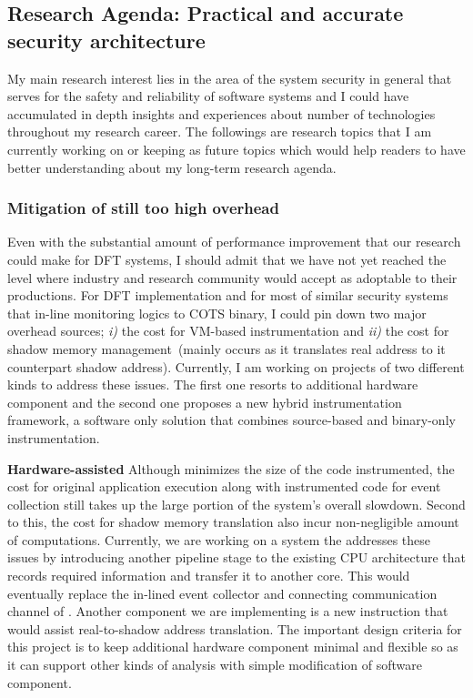 \documentclass[letterpaper, 10pt]{article}
\begin{document}
\begin{small}
\subsection*{Research Agenda: Practical and accurate security architecture}
%
My main research interest lies in the area of the system security in general
that serves for the safety and reliability of software systems  and I could
have accumulated in depth insights and experiences about number of technologies
throughout my research career.
%
The followings are research topics that I am currently working on or keeping as
future topics which would help readers to have better understanding about my
long-term research agenda.
%

\subsubsection*{Mitigation of still too high overhead}
%
Even with the substantial amount of performance improvement that our research
could make for DFT systems, I should admit that we have not yet reached the
level where industry and research community would accept as adoptable to their
productions.
%
For DFT implementation and for most of similar security systems that in-line
monitoring logics to COTS binary, I could pin down two major overhead sources;
{\it i)} the cost for VM-based instrumentation and {\it ii)} the cost for
shadow memory management~(mainly occurs as it translates real address to it
counterpart shadow address).
%
Currently, I am working on projects of two different kinds to address these
issues. The first one resorts to additional hardware component and the second
one proposes a new hybrid instrumentation framework, a software only
solution that combines source-based and binary-only instrumentation.

{\bf Hardware-assisted \SR} Although \SR minimizes the size of the code
instrumented, the cost for original application execution along with
instrumented code for event collection still takes up the large portion of the
system's overall slowdown. Second to this, the cost for shadow memory
translation also incur non-negligible amount of computations.
%
Currently, we are working on a system the addresses these issues by introducing
another pipeline stage to the existing CPU architecture that records required
information and transfer it to another core. This would eventually replace the
in-lined event collector and connecting communication channel of \SR. Another
component we are implementing is a new instruction that would assist
real-to-shadow address translation. The important design criteria for this
project is to keep additional hardware component minimal and flexible so as it
can support other kinds of analysis with simple modification of software
component.


\end{small}
\end{document}
